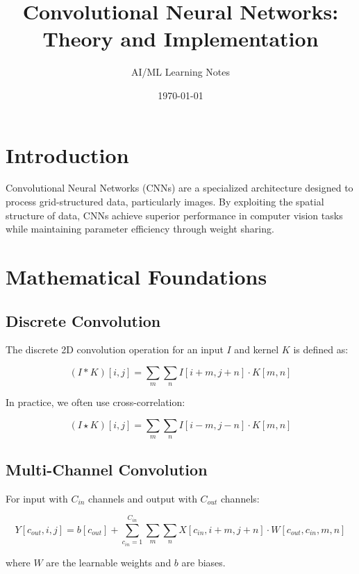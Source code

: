 \documentclass[12pt,a4paper]{article}
\title{Convolutional Neural Networks: Theory and Implementation}
\author{AI/ML Learning Notes}
\date{\today}
\begin{document}
\maketitle
\tableofcontents
\newpage

\section{Introduction}

Convolutional Neural Networks (CNNs) are a specialized architecture designed to process grid-structured data, particularly images. By exploiting the spatial structure of data, CNNs achieve superior performance in computer vision tasks while maintaining parameter efficiency through weight sharing.

\section{Mathematical Foundations}

\subsection{Discrete Convolution}

The discrete 2D convolution operation for an input $I$ and kernel $K$ is defined as:

\begin{equation}
(I * K)[i, j] = \sum_{m} \sum_{n} I[i+m, j+n] \cdot K[m, n]
\end{equation}

In practice, we often use cross-correlation:

\begin{equation}
(I \star K)[i, j] = \sum_{m} \sum_{n} I[i-m, j-n] \cdot K[m, n]
\end{equation}

\subsection{Multi-Channel Convolution}

For input with $C_{in}$ channels and output with $C_{out}$ channels:

\begin{equation}
Y[c_{out}, i, j] = b[c_{out}] + \sum_{c_{in}=1}^{C_{in}} \sum_{m} \sum_{n} X[c_{in}, i+m, j+n] \cdot W[c_{out}, c_{in}, m, n]
\end{equation}

where $W$ are the learnable weights and $b$ are biases.
\end{document}
